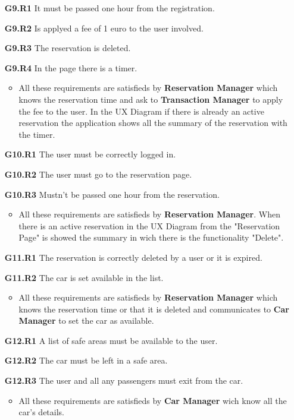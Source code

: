 \begin{itemize}
\item[\textbf{G9.R1}] It must be passed one hour from the registration.
\item[\textbf{G9.R2}] Is applyed a fee of 1 euro to the user involved.
\item[\textbf{G9.R3}] The reservation is deleted.
\item[\textbf{G9.R4}] In the page there is a timer.
\begin{itemize}
\item All these requirements are satisfieds by \textbf{Reservation Manager} which knows the reservation time and ask to \textbf{Transaction Manager} to apply the fee to the user. In the UX Diagram if there is already an active reservation the application shows all the summary of the reservation with the timer.
\end{itemize}

\item[\textbf{G10.R1}] The user must be correctly logged in.
\item[\textbf{G10.R2}] The user must go to the reservation page.
\item[\textbf{G10.R3}] Mustn't be passed one hour from the reservation.
\begin{itemize}
\item All these requirements are satisfieds by \textbf{Reservation Manager}. When there is an active reservation in the UX Diagram from the "Reservation Page" is showed the summary in wich there is the functionality "Delete".
\end{itemize}

\item[\textbf{G11.R1}] The reservation is correctly deleted by a user or it is expired. 
\item[\textbf{G11.R2}] The car is set available in the list.
\begin{itemize}
\item All these requirements are satisfieds by \textbf{Reservation Manager} which knows the reservation time or that it is deleted and communicates to \textbf{Car Manager} to set the car as available.
\end{itemize}


\item[\textbf{G12.R1}] A list of safe areas must be available to the user.
\item[\textbf{G12.R2}] The car must be left in a safe area.
\item[\textbf{G12.R3}] The user and all any passengers must exit from the car.
\begin{itemize}
\item All these requirements are satisfieds by \textbf{Car Manager} wich know all the car's details.
\end{itemize}



\end{itemize}
